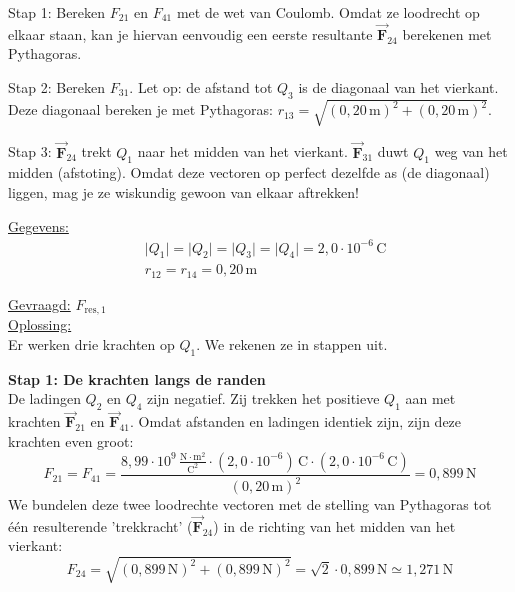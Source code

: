 \documentclass{ximera}
\begin{document}
\begin{exercise}
\begin{question}
        \begin{hint}
            Stap 1: Bereken $F_{21}$ en $F_{41}$ met de wet van Coulomb. Omdat ze loodrecht op elkaar staan, kan je hiervan eenvoudig een eerste resultante $\vec{\mathbf{F}}_{24}$ berekenen met Pythagoras.
        \end{hint}
        \begin{hint}
            Stap 2: Bereken $F_{31}$. Let op: de afstand tot $Q_3$ is de diagonaal van het vierkant. Deze diagonaal bereken je met Pythagoras: $r_{13} = \sqrt{(0{,}20\,\mathrm{m})^2 + (0{,}20\,\mathrm{m})^2}$.
        \end{hint}
        \begin{hint}
            Stap 3: $\vec{\mathbf{F}}_{24}$ trekt $Q_1$ naar het midden van het vierkant. $\vec{\mathbf{F}}_{31}$ duwt $Q_1$ weg van het midden (afstoting). Omdat deze vectoren op perfect dezelfde as (de diagonaal) liggen, mag je ze wiskundig gewoon van elkaar aftrekken!
        \end{hint}

        \begin{solution}\nl
            \underline{Gegevens:}
            \begin{align*}
                & \lvert Q_{1} \rvert = \lvert Q_{2} \rvert = \lvert Q_{3} \rvert = \lvert Q_{4} \rvert = 2{,}0 \cdot 10^{-6} \, \mathrm{C} \\
                & r_{12} = r_{14} = 0{,}20 \, \mathrm{m}
            \end{align*}
    
            \underline{Gevraagd:} $F_{\text{res},1}$\\ 
    
            \underline{Oplossing:}\\
            Er werken drie krachten op $Q_1$. We rekenen ze in stappen uit.
            
            \textbf{Stap 1: De krachten langs de randen}\\
            De ladingen $Q_2$ en $Q_4$ zijn negatief. Zij trekken het positieve $Q_1$ aan met krachten $\vec{\mathbf{F}}_{21}$ en $\vec{\mathbf{F}}_{41}$. Omdat afstanden en ladingen identiek zijn, zijn deze krachten even groot:
            \[
                F_{21} = F_{41} = \frac{8{,}99  \cdot 10^9 \, \mathrm{\frac{N \cdot m^2}{C^2}}\cdot (2{,}0 \cdot 10^{-6})\,\mathrm{C} \cdot (2{,}0 \cdot 10^{-6}\,\mathrm{C})}{(0{,}20\,\mathrm{m})^2} = 0{,}899 \, \mathrm{N}
            \]
            We bundelen deze twee loodrechte vectoren met de stelling van Pythagoras tot één resulterende 'trekkracht' ($\vec{\mathbf{F}}_{24}$) in de richting van het midden van het vierkant:
            \[
                F_{24} = \sqrt{(0{,}899\,\mathrm{N})^2 + (0{,}899\,\mathrm{N})^2} = \sqrt{2} \cdot 0{,}899\,\mathrm{N} \simeq 1{,}271 \, \mathrm{N}
            \]
            

\end{solution}
\end{question}
\end{exercise}
\end{document}
